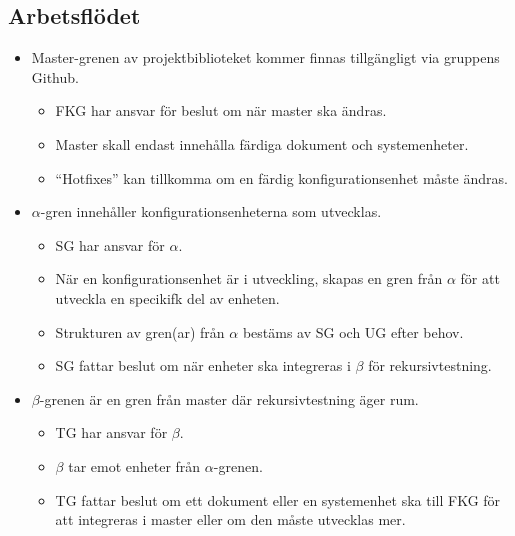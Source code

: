 \documentclass[paper=a4, fontsize=11pt,twoside]{article}
\begin{document}
\subsection*{Arbetsflödet}
\begin{itemize}

\item Master-grenen av projektbiblioteket kommer finnas tillgängligt via gruppens Github.
	\begin{itemize}
	\item FKG har ansvar för beslut om när master ska ändras.
	\item Master skall endast innehålla färdiga dokument och systemenheter.
	\item ``Hotfixes'' kan tillkomma om en färdig konfigurationsenhet måste ändras.
	\end{itemize}

\item $\alpha$-gren innehåller konfigurationsenheterna som utvecklas.
	\begin{itemize}
	\item SG har ansvar för $\alpha$.
	\item När en konfigurationsenhet är i utveckling, skapas en gren från $\alpha$ för
	att utveckla en specikifk del av enheten.
	\item Strukturen av gren(ar) från $\alpha$ bestäms av SG och UG efter behov.
	\item SG fattar beslut om när enheter ska integreras i $\beta$ för
	rekursivtestning. 
	\end{itemize}
	
\item $\beta$-grenen är en gren från master där rekursivtestning äger rum.
	\begin{itemize}
	\item TG har ansvar för $\beta$. 
	\item $\beta$ tar emot enheter från $\alpha$-grenen. 
	\item TG fattar beslut om ett dokument eller en systemenhet ska till FKG för att integreras i master eller om den måste utvecklas mer. 
	\end{itemize}
	
\end{itemize}
\end{document}
